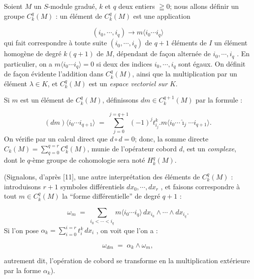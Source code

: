 Soient $M$ un $S$-module gradué, $k$ et $q$ deux entiers $\geqq 0$; nous allons définir un groupe $C^q_k(M)$ : un élément de $C^q_k(M)$ est une application

\begin{equation*}
(i_0 , \cdots , i_q) \to m\langle i_0 \cdots i_q \rangle
\end{equation*}
qui fait correspondre à toute suite $(i_0 , \cdots , i_q)$ de $q + 1$ éléments de $I$ un élément homogène de degré $k(q + 1)$ de $M$, dépendant de façon alternée de $i_0 , \cdots , i_q$ . En particulier, on a $m\langle i_0 \cdots i_q \rangle = 0$ si deux des indices $i_0 , \cdots , i_q$ sont égaux. On définit de façon évidente l'addition dans $C^q_k(M)$, ainsi que la multiplication par un élément $\lambda \in K$, et $C^q_k(M)$ est un \textit{espace vectoriel sur} $K$.

Si $m$ est un élément de $C^q_k(M)$, définissons $dm \in C^{q+1}_k(M)$ par la formule :

\begin{equation*}
(dm)\langle i_0 \cdots i_{q+1} \rangle \;=\; \sum_{j=0}^{j=q+1} (-1)^j t^k_{i_j}.m\langle i_0 \cdots \hat{\imath}_j \cdots i_{q+1} \rangle.
\end{equation*}
On vérifie par un calcul direct que $d \circ d = 0$; donc, la somme directe $C_k(M) = \sum_{q=0}^{q=r} C^q_k(M)$, munie de l'opérateur cobord $d$, est un \textit{complexe}, dont le $q$-ème groupe de cohomologie sera noté $H^q_k(M)$.

(Signalons, d'après [11], une autre interprétation des éléments de $C^q_k(M)$ : introduisons $r + 1$ symboles différentiels $dx_0 , \cdots , dx_r$ , et faisons correspondre à tout $m \in C^q_k(M)$ la ``forme différentielle'' de degré $q + 1$ :

\begin{equation*}
\omega_m \;=\; \sum_{i_0<\cdots<i_q} m\langle i_0 \cdots i_q \rangle \, dx_{i_0} \wedge \cdots \wedge dx_{i_q} .
\end{equation*}
Si l'on pose $\alpha_k = \sum_{i=0}^{i=r} t^k_i \, dx_i$ , on voit que l'on a :

\begin{equation*}
\omega_{dm} \;=\; \alpha_k \wedge \omega_m ,
\end{equation*}


 autrement dit, l'opération de cobord se transforme en la multiplication extérieure par la forme $\alpha_k$).

